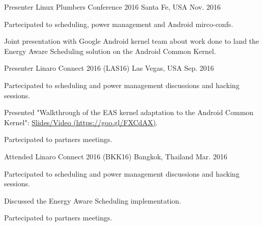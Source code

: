 

\begin{cventries}
  \cventry
    {Presenter} %
    {Linux Plumbers Conference 2016} %
    {Santa Fe, USA} %
    {Nov. 2016} %
    {
      \begin{cvitems} %
        \item {Partecipated to scheduling, power management and Android mirco-confs.}
        \item {Joint presentation with Google Android kernel team about work
		done to land the Energy Aware Scheduling solution on the Android
		Common Kernel.}
      \end{cvitems}
    }

  \cventry
    {Presenter} %
    {Linaro Connect 2016 (LAS16)} %
    {Las Vegas, USA} %
    {Sep. 2016} %
    {
      \begin{cvitems} %
        \item {Partecipated to scheduling and power management discussions and
		hacking sessions.}
        \item {Presented "Walkthrough of the EAS kernel adaptation to the
		Android Common Kernel":
		\href{http://connect.linaro.org/resource/las16/las16-105/}{Slides/Video (https://goo.gl/FXCdAX)}.}
        \item {Partecipated to partners meetings.}
      \end{cvitems}
    }

  \cventry
    {Attended} %
    {Linaro Connect 2016 (BKK16)} %
    {Bangkok, Thailand} %
    {Mar. 2016} %
    {
      \begin{cvitems} %
        \item {Partecipated to scheduling and power management discussions and
		hacking sessions.}
        \item {Discussed the Energy Aware Scheduling implementation.}
        \item {Partecipated to partners meetings.}
      \end{cvitems}
    }


\end{cventries}
